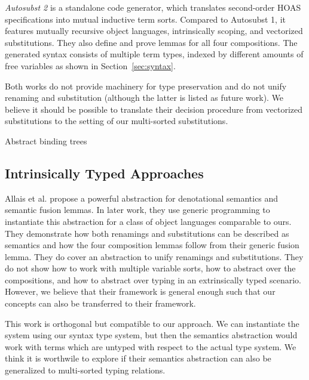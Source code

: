 \documentclass[sigplan,10pt, anonymous]{acmart}
\begin{document}
  \emph{Autosubst 2}\cite{DBLP:conf/cpp/StarkSK19} is a standalone
  code generator, which translates second-order HOAS specifications into
  mutual inductive term sorts. Compared to Autosubst 1, it features
  mutually recursive object languages, intrinsically scoping, and
  vectorized substitutions.
  They also define and prove lemmas for all four compositions.
  The generated syntax consists of multiple term types, indexed by
  different amounts of free variables as shown in Section~\ref{sec:syntax}.

  Both works do not provide machinery for type preservation and
  do not unify renaming and substitution (although the latter is listed as
  future work). We believe it should be possible to translate their
  decision procedure from vectorized substitutions to the setting of
  our multi-sorted substitutions.

  Abstract binding trees

  \subsection{Intrinsically Typed Approaches}

  Allais et al.\cite{DBLP:conf/cpp/Allais0MM17} propose a powerful
  abstraction for denotational semantics and semantic fusion lemmas.
  In later work\cite{DBLP:journals/pacmpl/AllaisA0MM18}, they use
  generic programming to instantiate this abstraction for a class of
  object languages comparable to ours.
  They demonstrate how both renamings and substitutions can be
  described as semantics and how the four composition lemmas follow from
  their generic fusion lemma.
  They do cover an abstraction to unify renamings and substitutions.
  They do not show how to work with multiple variable sorts, how to
  abstract over the compositions, and how to abstract over typing in
  an extrinsically typed scenario.
  However, we believe that their framework is general enough such that
  our concepts can also be transferred to their framework.

  This work is orthogonal but compatible to our approach.
  We can instantiate the system using our syntax type system,
  but then the semantics abstraction would work with terms
  which are untyped with respect to the actual type system.
  We think it is worthwile to explore if their semantics abstraction
  can also be generalized to multi-sorted typing relations.
\end{document}
